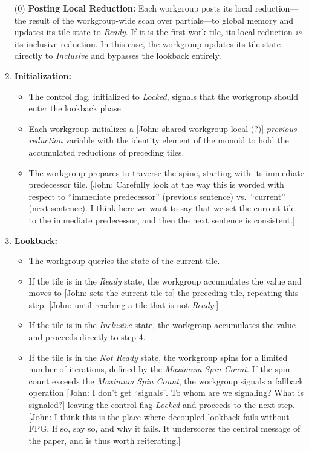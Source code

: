 \documentclass[sigconf]{acmart}
\newcommand{\john}[1]{{\footnotesize\color{cyan}[John: #1]}}
\begin{document}
\begin{enumerate}
  \item[(0)] \textbf{Posting Local Reduction:} Each workgroup posts its local reduction---the result of the workgroup-wide scan over partials---to global memory and updates its tile state to \emph{Ready}. If it is the first work tile, its local reduction \emph{is} its inclusive reduction. In this case, the workgroup updates its tile state directly to \emph{Inclusive} and bypasses the lookback entirely.

  \item \textbf{Initialization:}
        \begin{itemize}
          \item The control flag, initialized to \emph{Locked}, signals that the workgroup should enter the lookback phase.
          \item Each workgroup initializes a \john{shared workgroup-local (?)} \emph{previous reduction} variable with the identity element of the monoid to hold the accumulated reductions of preceding tiles.
          \item The workgroup prepares to traverse the spine, starting with its immediate predecessor tile. \john{Carefully look at the way this is worded with respect to ``immediate predecessor'' (previous sentence) vs.\ ``current'' (next sentence). I think here we want to say that we set the current tile to the immediate predecessor, and then the next sentence is consistent.}
        \end{itemize}

  \item \textbf{Lookback:}
        \begin{itemize}
          \item The workgroup queries the state of the current tile.
          \item If the tile is in the \emph{Ready} state, the workgroup accumulates the value and moves to \john{sets the current tile to} the preceding tile, repeating this step. \john{until reaching a tile that is not \emph{Ready}.}
          \item If the tile is in the \emph{Inclusive} state, the workgroup accumulates the value and proceeds directly to step 4.
          \item If the tile is in the \emph{Not Ready} state, the workgroup spins for a limited number of iterations, defined by the \emph{Maximum Spin Count}. If the spin count exceeds the \emph{Maximum Spin Count}, the workgroup signals a fallback operation \john{I don't get ``signals''. To whom are we signaling? What is signaled?} leaving the control flag \emph{Locked} and proceeds to the next step. \john{I think this is the place where decoupled-lookback fails without FPG\@. If so, say so, and why it fails. It underscores the central message of the paper, and is thus worth reiterating.}
        \end{itemize}


\end{enumerate}
\end{document}
